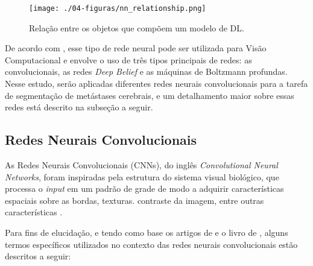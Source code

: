 \begin{figure}[!htb]
\centering
    \texttt{[image: ./04-figuras/nn\_relationship.png]}
	\caption{Relação entre os objetos que compõem um modelo de DL.}\vspace{-0.2cm}
    \label{fig:nn_relationship}
\end{figure}

De acordo com \cite{Voulodimos:2018}, esse tipo de rede neural pode ser utilizada para Visão Computacional e envolve o uso de três tipos principais de redes: as convolucionais, as redes \textit{Deep Belief} e as máquinas de Boltzmann profundas. Nesse estudo, serão aplicadas diferentes redes neurais convolucionais para a tarefa de segmentação de metástases cerebrais, e um detalhamento maior sobre essas redes está descrito na subseção a seguir.


\subsection{Redes Neurais Convolucionais}

As Redes Neurais Convolucionais (CNNs), do inglês \textit{Convolutional Neural Networks}, foram inspiradas pela estrutura do sistema visual biológico, que processa o \textit{input} em um padrão de grade de modo a adquirir características espaciais sobre as bordas, texturas. contraste da imagem, entre outras características \cite{Yamashita:2018}.

Para fins de elucidação, e tendo como base os artigos de \cite{Voulodimos:2018,Yamashita:2018} e o livro de \cite{Chollet:2017}, alguns termos específicos utilizados no contexto das redes neurais convolucionais estão descritos a seguir: 

